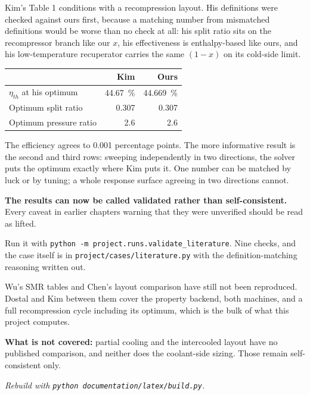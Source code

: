 \documentclass[11pt,a4paper]{report}
\newcommand{\code}[1]{\texttt{\small #1}}
\begin{document}
Kim's Table 1 conditions with a recompression layout. His definitions were
checked against ours first, because a matching number from mismatched
definitions would be worse than no check at all: his split ratio sits on
the recompressor branch like our $x$, his effectiveness is enthalpy-based
like ours, and his low-temperature recuperator carries the same $(1-x)$ on
its cold-side limit.

\begin{center}
\begin{tabular}{@{}lrr@{}}
\toprule
 & Kim & Ours \\
\midrule
$\eta_{th}$ at his optimum & \SI{44.67}{\percent} & \SI{44.669}{\percent} \\
Optimum split ratio        & \num{0.307} & \num{0.307} \\
Optimum pressure ratio     & \num{2.6}   & \num{2.6} \\
\bottomrule
\end{tabular}
\end{center}

The efficiency agrees to \num{0.001} percentage points. The more
informative result is the second and third rows: sweeping independently in
two directions, the solver puts the optimum exactly where Kim puts it. One
number can be matched by luck or by tuning; a whole response surface
agreeing in two directions cannot.

\begin{choicebox}
\textbf{The  results can now be called validated rather than
self-consistent.} Every caveat in earlier chapters warning that they were
unverified should be read as lifted.

Run it with \code{python -m project.runs.validate\_literature}. Nine
checks, and the case itself is in \code{project/cases/literature.py} with
the definition-matching reasoning written out.
\end{choicebox}

\begin{caveat}[title={Caveat: validated against two sources, not four}]
Wu's SMR tables and Chen's layout comparison have still not been
reproduced. Dostal and Kim between them cover the property backend, both
machines, and a full recompression cycle including its optimum, which is
the bulk of what this project computes.

\textbf{What is not covered:} partial cooling and the intercooled layout
have no published comparison, and neither does the coolant-side sizing.
Those remain self-consistent only.
\end{caveat}

\vfill
\begin{center}\small\itshape
Rebuild with \code{python documentation/latex/build.py}.
\end{center}
\end{document}

